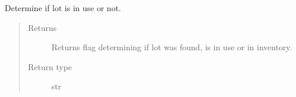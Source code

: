 \documentclass[letterpaper,10pt,english]{sphinxmanual}
\begin{document}
\begin{fulllineitems}
\begin{fulllineitems}
\begin{quote}
\begin{description}
\end{description}\end{quote}

\end{fulllineitems}


\begin{fulllineitems}
\label{\detokenize{source/optimization.datatools:optimization.datatools.extra_output.FindLot.lot_usage}}
Determine if lot is in use or not.
\begin{quote}\begin{description}
\item[{Returns}] \leavevmode
Returns flag determining if lot was found, is in use or in inventory.

\item[{Return type}] \leavevmode
str

\end{description}\end{quote}

\end{fulllineitems}


\end{fulllineitems}


\begin{fulllineitems}
\label{\detokenize{source/optimization.datatools:optimization.datatools.extra_output.classify_row}}
\end{fulllineitems}

\end{document}
